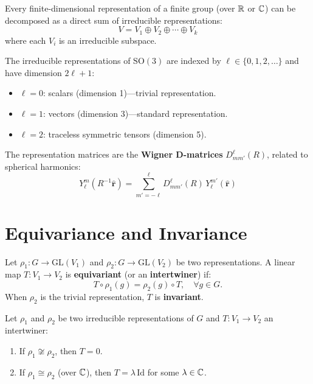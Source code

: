 \begin{theorem}
Every finite-dimensional representation of a finite group (over $\mathbb{R}$ or $\mathbb{C}$)
can be decomposed as a direct sum of irreducible representations:
\[
    V = V_1 \oplus V_2 \oplus \cdots \oplus V_k
\]
where each $V_i$ is an irreducible subspace.
\end{theorem}

\begin{keyformulas}[title=\textbf{Irreducible representations of $\mathrm{SO}(3)$}]
The irreducible representations of $\mathrm{SO}(3)$ are indexed by
$\ell \in \{0, 1, 2, \ldots\}$ and have dimension $2\ell + 1$:
\begin{itemize}
    \item $\ell = 0$: scalars (dimension 1)---trivial representation.
    \item $\ell = 1$: vectors (dimension 3)---standard representation.
    \item $\ell = 2$: traceless symmetric tensors (dimension 5).
\end{itemize}
The representation matrices are the \textbf{Wigner D-matrices}
$D^\ell_{mm'}(R)$, related to spherical harmonics:
\[
    Y_\ell^m(R^{-1}\hat{\mathbf{r}}) = \sum_{m'=-\ell}^{\ell}
    D^\ell_{mm'}(R)\, Y_\ell^{m'}(\hat{\mathbf{r}})
\]
\end{keyformulas}

\section{Equivariance and Invariance}

\begin{definition}
Let $\rho_1: G \to \mathrm{GL}(V_1)$ and $\rho_2: G \to \mathrm{GL}(V_2)$
be two representations. A linear map $T: V_1 \to V_2$ is \textbf{equivariant}
(or an \textbf{intertwiner}) if:
\[
    T \circ \rho_1(g) = \rho_2(g) \circ T, \quad \forall g \in G.
\]
When $\rho_2$ is the trivial representation, $T$ is \textbf{invariant}.
\end{definition}

\begin{theorem}
Let $\rho_1$ and $\rho_2$ be two irreducible representations of $G$ and
$T: V_1 \to V_2$ an intertwiner:
\begin{enumerate}
    \item If $\rho_1 \not\cong \rho_2$, then $T = 0$.
    \item If $\rho_1 \cong \rho_2$ (over $\mathbb{C}$), then $T = \lambda\, \mathrm{Id}$
          for some $\lambda \in \mathbb{C}$.
\end{enumerate}
\end{theorem}

